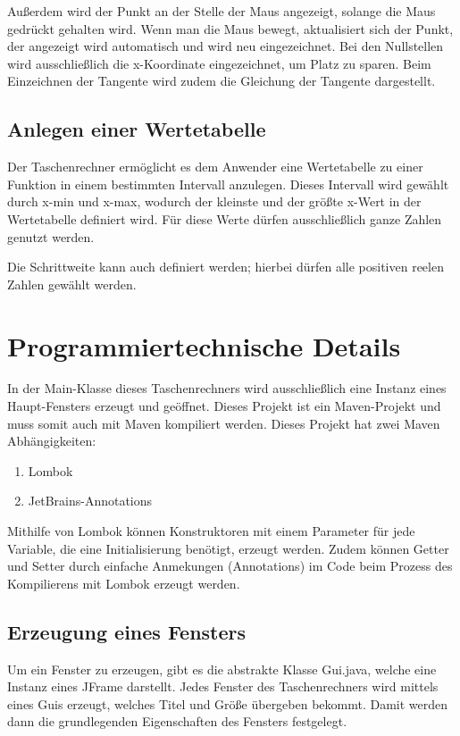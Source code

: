 \documentclass[12pt,a4paper]{article}
\begin{document}
    Außerdem wird der Punkt an der Stelle der Maus angezeigt, solange die Maus gedrückt gehalten wird.
    Wenn man die Maus bewegt, aktualisiert sich der Punkt, der angezeigt wird automatisch und wird neu eingezeichnet.
    Bei den Nullstellen wird ausschließlich die x-Koordinate eingezeichnet, um Platz zu sparen.
    Beim Einzeichnen der Tangente wird zudem die Gleichung der Tangente dargestellt.

    \subsection{Anlegen einer Wertetabelle}
    Der Taschenrechner ermöglicht es dem Anwender eine Wertetabelle zu einer Funktion in einem bestimmten Intervall anzulegen.
    Dieses Intervall wird gewählt durch x-min und x-max, wodurch der kleinste und der größte x-Wert in der Wertetabelle definiert wird.
    Für diese Werte dürfen ausschließlich ganze Zahlen genutzt werden.\par
    Die Schrittweite kann auch definiert werden; hierbei dürfen alle positiven reelen Zahlen gewählt werden.

    \newpage


    \section{Programmiertechnische Details}

    In der Main-Klasse dieses Taschenrechners wird ausschließlich eine Instanz eines Haupt-Fensters erzeugt und geöffnet.
    Dieses Projekt ist ein Maven-Projekt und muss somit auch mit Maven kompiliert werden.
    Dieses Projekt hat zwei Maven Abhängigkeiten:

    \begin{enumerate}
        \item Lombok
        \item JetBrains-Annotations
    \end{enumerate}

    Mithilfe von Lombok können Konstruktoren mit einem Parameter für jede Variable, die eine Initialisierung benötigt,
    erzeugt werden.
    Zudem können Getter und Setter durch einfache Anmekungen (Annotations) im Code beim Prozess des Kompilierens mit
    Lombok erzeugt werden.

    \subsection{Erzeugung eines Fensters}
    Um ein Fenster zu erzeugen, gibt es die abstrakte Klasse Gui.java, welche eine Instanz eines JFrame darstellt.
    Jedes Fenster des Taschenrechners wird mittels eines Guis erzeugt, welches Titel und Größe übergeben bekommt.
    Damit werden dann die grundlegenden Eigenschaften des Fensters festgelegt.
\end{document}
